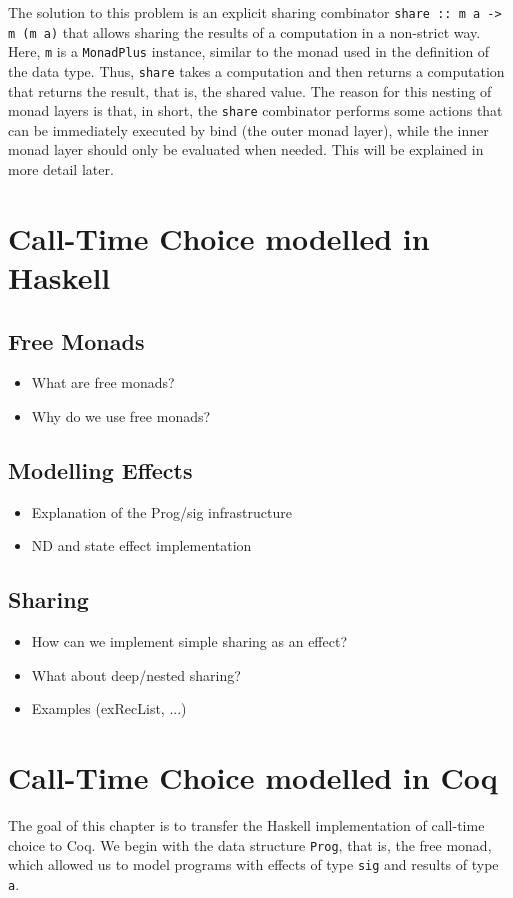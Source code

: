 \documentclass[a4paper, 11pt, fleqn, twoside]{scrreprt}
\begin{document}
The solution to this problem is an explicit sharing combinator 
\texttt{share :: m a -> m (m a)} that allows sharing the results 
of a computation in a non-strict way. Here, \texttt{m} is a 
\texttt{MonadPlus} instance, similar to the monad used in the 
definition of the data type. Thus, \texttt{share} takes a 
computation and then returns a computation that returns the result, that is, 
the shared value. The reason for this nesting of monad layers is that, in 
short, the \texttt{share} combinator performs some actions that 
can be immediately executed by bind (the outer monad layer), while the inner 
monad layer should only be evaluated when needed. This will be explained in 
more detail later.
\chapter{Call-Time Choice modelled in Haskell}

\section{Free Monads}
\begin{itemize}
\item What are free monads?
\item Why do we use free monads?
\end{itemize}

\section{Modelling Effects}
\begin{itemize}
\item Explanation of the Prog/sig infrastructure
\item ND and state effect implementation 
\end{itemize}

\section{Sharing}
\begin{itemize}
\item How can we implement simple sharing as an effect?
\item What about deep/nested sharing?
\item Examples (exRecList, ...)
\end{itemize}


\chapter{Call-Time Choice modelled in Coq}
The goal of this chapter is to transfer the Haskell implementation of call-time 
choice to Coq. We begin with the data structure \texttt{Prog}, 
that is, the free monad, which allowed us to model programs with effects of 
type \texttt{sig} and results of type \texttt{a}.
\end{document}
